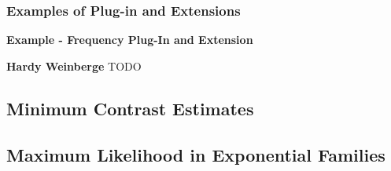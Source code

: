 		\subsubsection{Examples of Plug-in and Extensions}
			\textbf{Example - Frequency Plug-In and Extension}

			\textbf{Hardy Weinberge}
			TODO

	\subsection{Minimum Contrast Estimates}

	\subsection{Maximum Likelihood in Exponential Families}
